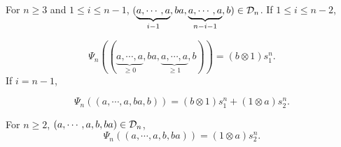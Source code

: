 \documentclass[10pt, reqno]{amsart}
\theoremstyle{definition}
\theoremstyle{remark}
\numberwithin{equation}{section}
\begin{document}
For \(n\ge 3\) and \(1\le i\le n-1\), \((\underbrace{a,\cdots,a}_{i-1}, ba,\underbrace{a,\cdots,a}_{n-i-1},b)\in \mathcal{D}_n\). If \(1\le i\le n-2\), 

$$\Psi_n((\underbrace{a,\cdots,a}_{\ge 0},ba,\underbrace{a,\cdots,a}_{\ge 1},b))=(b\otimes1)s_1^n.$$
If $i=n-1$, 

$$\Psi_n((a,\cdots,a,ba,b))=(b\otimes1)s_1^n+(1\otimes a)s_2^n.$$


For \(n\ge 2\), \((a,\cdots,a,b,ba)\in \mathcal{D}_n\),
$$\Psi_n((a,\cdots,a,b,ba))=(1\otimes a)s_2^n.$$
\end{document}
